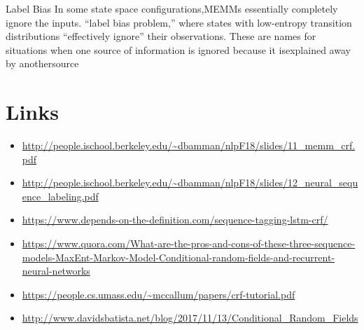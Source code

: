 Label Bias
In some state space configurations,MEMMs essentially completely ignore the inputs.
``label bias problem,'' where states with low-entropy transition distributions ``effectively ignore'' their observations.
These are names for situations when one source of information is ignored because it isexplained away by anothersource


\section{Links}

\begin{itemize}

\item \url{http://people.ischool.berkeley.edu/~dbamman/nlpF18/slides/11_memm_crf.pdf}

\item \url{http://people.ischool.berkeley.edu/~dbamman/nlpF18/slides/12_neural_sequence_labeling.pdf}

\item \url{https://www.depends-on-the-definition.com/sequence-tagging-lstm-crf/}

\item \url{https://www.quora.com/What-are-the-pros-and-cons-of-these-three-sequence-models-MaxEnt-Markov-Model-Conditional-random-fields-and-recurrent-neural-networks}

\item \url{https://people.cs.umass.edu/~mccallum/papers/crf-tutorial.pdf}

\item \url{http://www.davidsbatista.net/blog/2017/11/13/Conditional_Random_Fields} 

\end{itemize}

